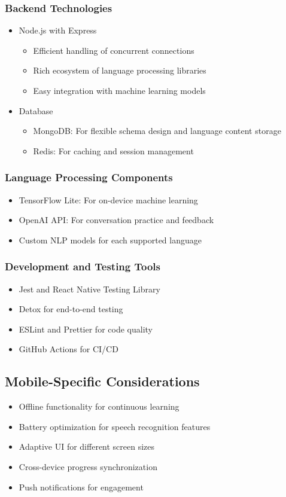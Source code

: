 \subsubsection{Backend Technologies}
\begin{itemize}
    \item Node.js with Express
    \begin{itemize}
        \item Efficient handling of concurrent connections
        \item Rich ecosystem of language processing libraries
        \item Easy integration with machine learning models
    \end{itemize}
    
    \item Database
    \begin{itemize}
        \item MongoDB: For flexible schema design and language content storage
        \item Redis: For caching and session management
    \end{itemize}
\end{itemize}

\subsubsection{Language Processing Components}
\begin{itemize}
    \item TensorFlow Lite: For on-device machine learning
    \item OpenAI API: For conversation practice and feedback
    \item Custom NLP models for each supported language
\end{itemize}

\subsubsection{Development and Testing Tools}
\begin{itemize}
    \item Jest and React Native Testing Library
    \item Detox for end-to-end testing
    \item ESLint and Prettier for code quality
    \item GitHub Actions for CI/CD
\end{itemize}

\subsection{Mobile-Specific Considerations}
\begin{itemize}
    \item Offline functionality for continuous learning
    \item Battery optimization for speech recognition features
    \item Adaptive UI for different screen sizes
    \item Cross-device progress synchronization
    \item Push notifications for engagement
\end{itemize} 